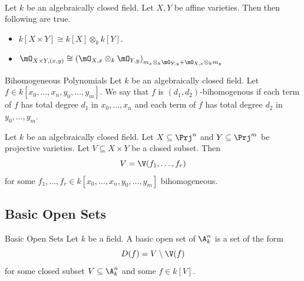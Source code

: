 \documentclass[a4paper]{article}
\begin{document}
\begin{lmm}{}{}\\
Let $k$ be an algebraically closed field. Let $X,Y$ be affine varieties. Then then following are true. 
\begin{itemize}
\item $k[X\times Y]\cong k[X]\otimes_kk[Y]$. 
\item $\mO_{X\times Y,(x,y)}\cong\left(\mO_{X,x}\otimes_k\mO_{Y,y}\right)_{m_x\otimes_k\mO_{Y,y}+\mO_{X,x}\otimes_km_y}$
\end{itemize}
\end{lmm}

\begin{defn}{Bihomogeneous Polynomials}{} Let $k$ be an algebraically closed field. Let $f\in k[x_0,\dots,x_n,y_0,\dots,y_m]$. We say that $f$ is $(d_1,d_2)$-bihomogenous if each term of $f$ has total degree $d_1$ in $x_0,\dots,x_n$ and each term of $f$ has total degree $d_2$ in $y_0,\dots,y_m$. 
\end{defn}

\begin{prp}{}{} Let $k$ be an algebraically closed field. Let $X\subseteq\Prj^n$ and $Y\subseteq\Prj^m$ be projective varieties. Let $V\subseteq X\times Y$ be a closed subset. Then $$V=\V(f_1,\dots,f_r)$$ for some $f_1,\dots,f_r\in k[x_0,\dots,x_n,y_0,\dots,y_m]$ bihomogeneous. 
\end{prp}

\subsection{Basic Open Sets}
\begin{defn}{Basic Open Sets}{} Let $k$ be a field. A basic open set of $\A_k^n$ is a set of the form $$D(f)=V\setminus\V(f)$$ for some closed subset $V\subseteq\A_k^n$ and some $f\in k[V]$. 
\end{defn}
\end{document}
